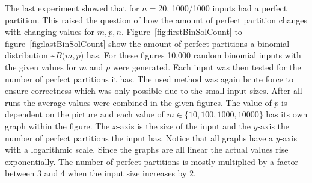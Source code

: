 The last experiment showed that for $n=20$, 1000/1000 inputs had a perfect partition. This raised the question of how the amount of perfect partition changes with changing values for $m, p, n$.
Figure~\ref{fig:firstBinSolCount} to figure~\ref{fig:lastBinSolCount} show the amount of perfect partitions a binomial distribution \textasciitilde$B(m,p$) has.
For these figures 10,000 random binomial inputs with the given values for $m$ and $p$ were generated.
Each input was then tested for the number of perfect partitions it has.
The used method was again brute force to ensure correctness which was only possible due to the small input sizes.
After all runs the average values were combined in the given figures.
The value of $p$ is dependent on the picture and each value of $m \in \{10,100,1000,10000\}$ has its own graph within the figure.
The $x$-axis is the size of the input and the $y$-axis the number of perfect partitions the input has.
Notice that all graphs have a $y$-axis with a logarithmic scale.
Since the graphs are all linear the actual values rise exponentially.
The number of perfect partitions is mostly multiplied by a factor between 3 and 4 when the input size increases by 2.

